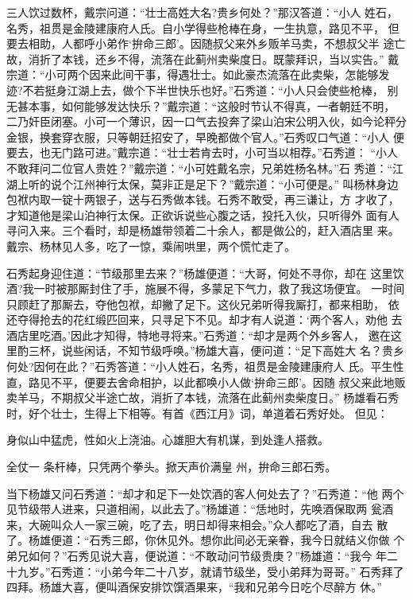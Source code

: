 三人饮过数杯，戴宗问道：“壮士高姓大名?贵乡何处？”那汉答道：“小人
姓石，名秀，祖贯是金陵建康府人氏。自小学得些枪棒在身，一生执意，路见不平，
但要去相助，人都呼小弟作‘拚命三郎’。因随叔父来外乡贩羊马卖，不想叔父半
途亡故，消折了本钱，还乡不得，流落在此蓟州卖柴度日。既蒙拜识，当以实告。”
戴宗道：“小可两个因来此间干事，得遇壮士。如此豪杰流落在此卖柴，怎能够发
迹?不若挺身江湖上去，做个下半世快乐也好。”石秀道：“小人只会使些枪棒，
别无甚本事，如何能够发达快乐？”戴宗道：“这般时节认不得真，一者朝廷不明，
二乃奸臣闭塞。小可一个薄识，因一口气去投奔了梁山泊宋公明入伙，如今论秤分
金银，换套穿衣服，只等朝廷招安了，早晚都做个官人。”石秀叹口气道：“小人
便要去，也无门路可进。”戴宗道：“壮士若肯去时，小可当以相荐。”石秀道：
“小人不敢拜问二位官人贵姓？”戴宗道：“小可姓戴名宗，兄弟姓杨名林。”石
秀道：“江湖上听的说个江州神行太保，莫非正是足下？”戴宗道：“小可便是。”
叫杨林身边包袱内取一锭十两银子，送与石秀做本钱。石秀不敢受，再三谦让，方
才收了，才知道他是梁山泊神行太保。正欲诉说些心腹之话，投托入伙，只听得外
面有人寻问入来。三个看时，却是杨雄带领着二十余人，都是做公的，赶入酒店里
来。戴宗、杨林见人多，吃了一惊，乘闹哄里，两个慌忙走了。

石秀起身迎住道：“节级那里去来？”杨雄便道：“大哥，何处不寻你，却在
这里饮酒?我一时被那厮封住了手，施展不得，多蒙足下气力，救了我这场便宜。
一时间只顾赶了那厮去，夺他包袱，却撇了足下。这伙兄弟听得我厮打，都来相助，
依还夺得抢去的花红缎匹回来，只寻足下不见。却才有人说道：‘两个客人，劝他
去酒店里吃酒。’因此才知得，特地寻将来。”石秀道：“却才是两个外乡客人，
邀在这里酌三杯，说些闲话，不知节级呼唤。”杨雄大喜，便问道：“足下高姓大
名？贵乡何处?因何在此？”石秀答道：“小人姓石，名秀，祖贯是金陵建康府人
氏。平生性直，路见不平，便要去舍命相护，以此都唤小人做‘拚命三郎’。因随
叔父来此地贩卖羊马，不期叔父半途亡故，消折了本钱，流落在此蓟州卖柴度日。”
杨雄看石秀时，好个壮士，生得上下相等。有首《西江月》词，单道着石秀好处。
但见：

身似山中猛虎，性如火上浇油。心雄胆大有机谋，到处逢人搭救。

全仗一
条杆棒，只凭两个拳头。掀天声价满皇
州，拚命三郎石秀。

当下杨雄又问石秀道：“却才和足下一处饮酒的客人何处去了？”石秀道：“他
两个见节级带人进来，只道相闹，以此去了。”杨雄道：“恁地时，先唤酒保取两
瓮酒来，大碗叫众人一家三碗，吃了去，明日却得来相会。”众人都吃了酒，自去
散了。杨雄便道：“石秀三郎，你休见外。想你此间必无亲眷，我今日就结义你做
个弟兄如何？”石秀见说大喜，便说道：“不敢动问节级贵庚？”杨雄道：“我今
年二十九岁。”石秀道：“小弟今年二十八岁，就请节级坐，受小弟拜为哥哥。”
石秀拜了四拜。杨雄大喜，便叫酒保安排饮馔酒果来，“我和兄弟今日吃个尽醉方
休。”

